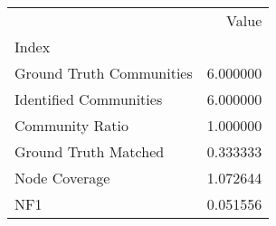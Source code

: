 \begin{tabular}{lr}
\toprule
{} &     Value \\
Index                    &           \\
\midrule
Ground Truth Communities &  6.000000 \\
Identified Communities   &  6.000000 \\
Community Ratio          &  1.000000 \\
Ground Truth Matched     &  0.333333 \\
Node Coverage            &  1.072644 \\
NF1                      &  0.051556 \\
\bottomrule
\end{tabular}
